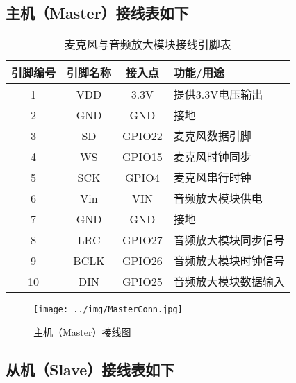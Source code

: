 \subsection{主机（Master）接线表如下}

\begin{table} [H]
    \centering
    \begin{tabular}{|c|c|c|l|}
    \hline
    \textbf{引脚编号} & \textbf{引脚名称} & \textbf{接入点} & \textbf{功能/用途} \\ 
    \hline
    1  & VDD   & 3.3V & 提供3.3V电压输出 \\ 
    2  & GND   & GND  & 接地 \\ 
    3  & SD    & GPIO22 & 麦克风数据引脚 \\ 
    4  & WS    & GPIO15 & 麦克风时钟同步 \\ 
    5  & SCK   & GPIO4  & 麦克风串行时钟 \\ 
    6  & Vin   & VIN   & 音频放大模块供电 \\ 
    7  & GND   & GND   & 接地 \\ 
    8  & LRC   & GPIO27 & 音频放大模块同步信号 \\ 
    9  & BCLK  & GPIO26 & 音频放大模块时钟信号 \\ 
    10 & DIN   & GPIO25 & 音频放大模块数据输入 \\ 
    \hline
    \end{tabular}
    \caption{麦克风与音频放大模块接线引脚表}
\end{table}

\begin{figure} [H]
    \centering
    \texttt{[image: ../img/MasterConn.jpg]}
    \caption{主机（Master）接线图}
\end{figure}

\subsection{从机（Slave）接线表如下}

